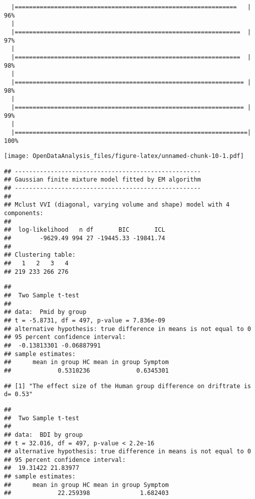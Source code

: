 \documentclass[]{article}
\begin{document}
\begin{verbatim}
  |==============================================================   |  96%
  |                                                                       
  |===============================================================  |  97%
  |                                                                       
  |===============================================================  |  98%
  |                                                                       
  |================================================================ |  98%
  |                                                                       
  |================================================================ |  99%
  |                                                                       
  |=================================================================| 100%
\end{verbatim}

\texttt{[image: OpenDataAnalysis\_files/figure-latex/unnamed-chunk-10-1.pdf]}

\begin{verbatim}
## ---------------------------------------------------- 
## Gaussian finite mixture model fitted by EM algorithm 
## ---------------------------------------------------- 
## 
## Mclust VVI (diagonal, varying volume and shape) model with 4 components: 
## 
##  log-likelihood   n df       BIC       ICL
##        -9629.49 994 27 -19445.33 -19841.74
## 
## Clustering table:
##   1   2   3   4 
## 219 233 266 276
\end{verbatim}

\begin{verbatim}
## 
##  Two Sample t-test
## 
## data:  Pmid by group
## t = -5.8731, df = 497, p-value = 7.836e-09
## alternative hypothesis: true difference in means is not equal to 0
## 95 percent confidence interval:
##  -0.13813301 -0.06887991
## sample estimates:
##      mean in group HC mean in group Symptom 
##             0.5310236             0.6345301
\end{verbatim}

\begin{verbatim}
## [1] "The effect size of the Human group difference on driftrate is d= 0.53"
\end{verbatim}

\begin{verbatim}
## 
##  Two Sample t-test
## 
## data:  BDI by group
## t = 32.016, df = 497, p-value < 2.2e-16
## alternative hypothesis: true difference in means is not equal to 0
## 95 percent confidence interval:
##  19.31422 21.83977
## sample estimates:
##      mean in group HC mean in group Symptom 
##             22.259398              1.682403
\end{verbatim}
\end{document}
